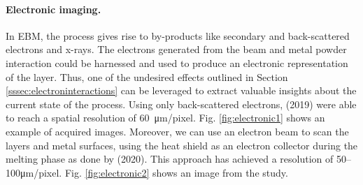 \paragraph{Electronic imaging.} In EBM, the process gives rise to by-products like secondary and back-scattered electrons and x-rays. The electrons generated from the beam and metal powder interaction could be harnessed and used to produce an electronic representation of the layer. Thus, one of the undesired effects outlined in Section \ref{sssec:electroninteractions} can be leveraged to extract valuable insights about the current state of the process. Using only back-scattered electrons, \citeauthor{wong_pilot_2019} (2019) were able to reach a spatial resolution of \SI{60}{\micro\metre / pixel}. Fig. \ref{fig:electronic1} shows an example of acquired images. Moreover, we can use an electron beam to scan the layers and metal surfaces, using the heat shield as an electron collector during the melting phase as done by \citeauthor{arnold_operando_2020} (2020). This approach has achieved a resolution of \numrange[range-phrase=--]{50}{100}\unit{\micro\metre / pixel}. Fig. \ref{fig:electronic2} shows an image from the study.
